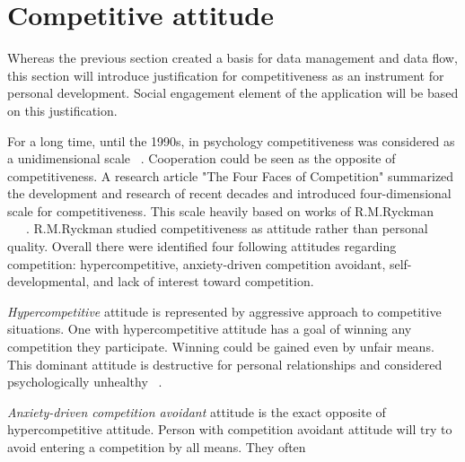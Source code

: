 
\section{Competitive attitude}\label{sec:competitive-attitude}



Whereas the previous section created a basis for data management and data flow,
this section will introduce justification for competitiveness as an instrument for personal development.
Social engagement element of the application will be based on this justification.

For a long time, until the 1990s, in psychology competitiveness was considered as a unidimensional scale ~\cite{the-four-faces-of-competetition}.
Cooperation could be seen as the opposite of competitiveness.
A research article "The Four Faces of Competition" summarized the development and research of recent decades and introduced four-dimensional scale for competitiveness.
This scale heavily based on works of R.M.Ryckman ~\cite{ryckman-hca}~\cite{ryckman-caa}~\cite{ryckman-pdca}.
R.M.Ryckman studied competitiveness as attitude rather than personal quality.
Overall there were identified four following attitudes regarding competition:
hypercompetitive, anxiety-driven competition avoidant, self-developmental, and lack of interest toward competition.

\textit{Hypercompetitive} attitude is represented by aggressive approach to competitive situations.
One with hypercompetitive attitude has a goal of winning any competition they participate.
Winning could be gained even by unfair means.
This dominant attitude is destructive for personal relationships and considered psychologically unhealthy ~\cite{ryckman-hca}.

\textit{Anxiety-driven competition avoidant} attitude is the exact opposite of hypercompetitive attitude.
Person with competition avoidant attitude will try to avoid entering a competition by all means.
They often
